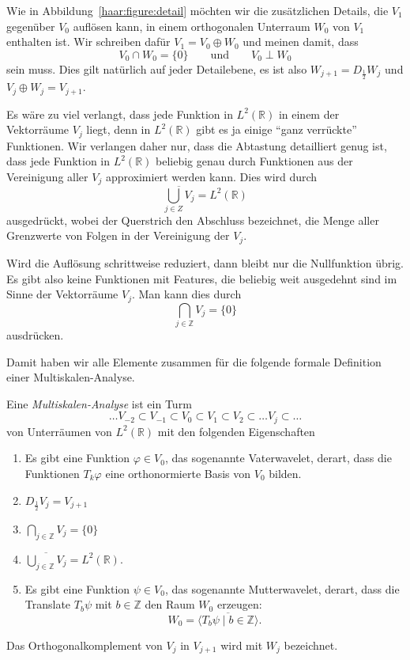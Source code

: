 Wie in Abbildung~\ref{haar:figure:detail} möchten wir die zusätzlichen
Details, die $V_1$ gegenüber $V_0$ auflösen kann, in einem orthogonalen
Unterraum $W_0$ von $V_1$ enthalten ist.
Wir schreiben dafür $V_1 = V_0 \oplus W_0$ und meinen damit, dass
\[
V_0\cap W_0= \{0\}
\qquad\text{und}\qquad
V_0 \perp W_0
\]
sein muss.
Dies gilt natürlich auf jeder Detailebene, es ist also
$W_{j+1} = D_{\frac12}W_j$ und $V_j\oplus W_j = V_{j+1}$.

Es wäre zu viel verlangt, dass jede Funktion in $L^2(\mathbb R)$ in
einem der Vektorräume $V_j$ liegt, denn in $L^2(\mathbb R)$ gibt
es ja einige ``ganz verrückte'' Funktionen.
Wir verlangen daher nur, dass die Abtastung detailliert genug ist, dass jede 
Funktion in $L^2(\mathbb R)$ beliebig genau durch Funktionen aus
der Vereinigung aller $V_j$ approximiert werden kann.
Dies wird durch
\[
\overline{\bigcup_{j\in Z} V_j} = L^2(\mathbb R)
\]
ausgedrückt, wobei der Querstrich den Abschluss bezeichnet, die Menge
aller Grenzwerte von Folgen in der Vereinigung der $V_j$.

Wird die Auflösung schrittweise reduziert, dann bleibt nur die Nullfunktion
übrig.
Es gibt also keine Funktionen mit Features, die beliebig weit ausgedehnt
sind im Sinne der Vektorräume $V_j$.
Man kann dies durch
\[
\bigcap_{j\in\mathbb Z} V_j = \{0\}
\]
ausdrücken.

Damit haben wir alle Elemente zusammen für die folgende formale Definition
einer Multiskalen-Analyse.

\begin{definition}
Eine {\em Multiskalen-Analyse} ist ein Turm
%
\[
\dots
V_{-2}\subset
V_{-1}\subset
V_0\subset
V_1\subset
V_2\subset
\dots
V_j\subset
\dots
\]
von Unterräumen von $L^2(\mathbb R)$ mit den folgenden Eigenschaften
\begin{enumerate}
\item Es gibt eine Funktion $\varphi\in V_0$, das sogenannte Vaterwavelet,
%
derart, dass die Funktionen
$T_k\varphi$ eine orthonormierte Basis von $V_0$ bilden.
\item $D_{\frac12} V_j = V_{j+1}$
\item $\displaystyle\bigcap_{j\in\mathbb Z} V_j = \{0\}$
\item $\displaystyle\overline{\bigcup_{j\in\mathbb Z} V_j} = L^2(\mathbb R)$.
\item Es gibt eine Funktion $\psi\in V_0$, das sogenannte
Mutterwavelet, derart, dass
%
die Translate $T_b\psi$ mit $b\in\mathbb Z$ den Raum $W_0$ erzeugen:
\[
W_0 = \overline{\langle T_b\psi\;|\;b\in\mathbb Z\rangle}.
\]
\end{enumerate}
Das Orthogonalkomplement von $V_j$ in $V_{j+1}$ wird mit $W_j$ bezeichnet.
%
\end{definition}

